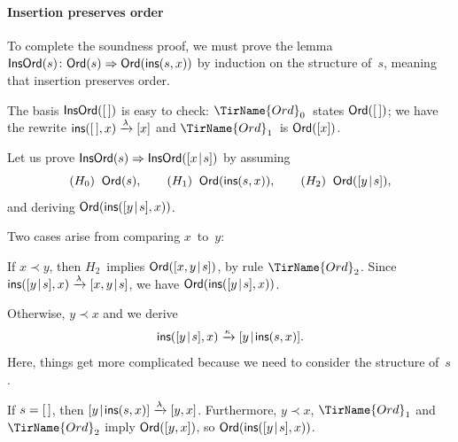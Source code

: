 \paragraph{Insertion preserves order}

To complete the soundness proof, we must prove the
lemma~\(\textsf{InsOrd}({s}) \colon \textsf{Ord}({s}) \Rightarrow
\textsf{Ord}({\textsf{ins}(s,x)})\) by induction on the
structure of~\(s\), meaning that insertion
preserves order.

\begin{itemize*}

  \item The basis \(\textsf{InsOrd}({[\,]})\) is easy to check:
    \(\TirName{Ord}_0\)~states \(\textsf{Ord}({[\,]})\); we have the
    rewrite \(\textsf{ins}([\,],x) \xrightarrow{\smash{\lambda}} [x]\) and
    \(\TirName{Ord}_1\)~is \(\textsf{Ord}({[x]})\).

  \item Let us prove \(\textsf{InsOrd}({s}) \Rightarrow
    \textsf{InsOrd}({[{x}\!\mid\!{s}]})\) by assuming
    \begin{equation*}
      (H_0) \;\; \textsf{Ord}({s}),\qquad
      (H_1) \;\; \textsf{Ord}({\textsf{ins}(s,x)}),\qquad
      (H_2) \;\; \textsf{Ord}({[{y}\!\mid\!{s}]}),
    \end{equation*}
    and deriving \(\textsf{Ord}({\textsf{ins}([{y}\!\mid\!{s}],x)})\).

    \noindent Two cases arise from comparing \(x\)~to~\(y\):
    \begin{itemize*}

      \item If \(x \prec y\), then \(H_2\)~implies
        \(\textsf{Ord}({[{x,y}\!\mid\!{s}]})\), by rule
        \(\TirName{Ord}_2\). Since \(\textsf{ins}([{y}\!\mid\!{s}],x)
        \xrightarrow{\smash{\lambda}} [{x,y}\!\mid\!{s}]\), we have
        \(\textsf{Ord}({\textsf{ins}([{y}\!\mid\!{s}],x)})\).

      \item Otherwise, \(y \prec x\) and we derive
        \begin{equation}
          \textsf{ins}([{y}\!\mid\!{s}],x) \xrightarrow{\smash{\kappa}}
          [{y}\!\mid\!{\textsf{ins}(s,x)}].\label{eq:A}
        \end{equation}
        Here, things get more complicated because we need to consider
        the structure of~\(s\).
        \begin{itemize*}

        \item If \(s=[\,]\), then \([{y}\!\mid\!{\textsf{ins}(s,x)}]
          \xrightarrow{\smash{\lambda}} [y,x]\). Furthermore, \(y
          \prec x\), \(\TirName{Ord}_1\) and \(\TirName{Ord}_2\) imply
          \(\textsf{Ord}({[y,x]})\), so
          \(\textsf{Ord}({\textsf{ins}([{y}\!\mid\!{s}],x)})\).


\end{itemize*}
\end{itemize*}
\end{itemize*}
